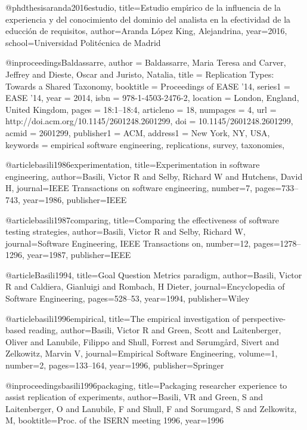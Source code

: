 @phdthesis{aranda2016estudio,
  title={Estudio emp{\'\i}rico de la influencia de la experiencia y del conocimiento del dominio del analista en la efectividad de la educci{\'o}n de requisitos},
  author={Aranda L{\'o}pez King, Alejandrina},
  year={2016},
  school={Universidad Polit{\'e}cnica de Madrid}
}

@inproceedings{Baldassarre,
 author = {Baldassarre, Maria Teresa and Carver, Jeffrey and Dieste, Oscar and Juristo, Natalia},
 title = {Replication Types: Towards a Shared Taxonomy},
 booktitle = {Proceedings of EASE '14},
 series1 = {EASE '14},
 year = {2014},
 isbn = {978-1-4503-2476-2},
 location = {London, England, United Kingdom},
 pages = {18:1--18:4},
 articleno = {18},
 numpages = {4},
 url = {http://doi.acm.org/10.1145/2601248.2601299},
 doi = {10.1145/2601248.2601299},
 acmid = {2601299},
 publisher1 = {ACM},
 address1 = {New York, NY, USA},
 keywords = {empirical software engineering, replications, survey, taxonomies},
}

@article{basili1986experimentation,
  title={Experimentation in software engineering},
  author={Basili, Victor R and Selby, Richard W and Hutchens, David H},
  journal={IEEE Transactions on software engineering},
  number={7},
  pages={733--743},
  year={1986},
  publisher={IEEE}
}

@article{basili1987comparing, 
  title={Comparing the effectiveness of software testing strategies},
  author={Basili, Victor R and Selby, Richard W},
  journal={Software Engineering, IEEE Transactions on},
  number={12},
  pages={1278--1296},
  year={1987},
  publisher={IEEE}
}

@article{Basili1994,
  title={Goal Question Metrics paradigm},
  author={Basili, Victor R and Caldiera, Gianluigi and Rombach, H Dieter},
  journal={Encyclopedia of Software Engineering},
  pages={528--53},
  year={1994},
  publisher={Wiley}
}

@article{basili1996empirical,
  title={The empirical investigation of perspective-based reading},
  author={Basili, Victor R and Green, Scott and Laitenberger, Oliver and Lanubile, Filippo and Shull, Forrest and S{\o}rumg{\aa}rd, Sivert and Zelkowitz, Marvin V},
  journal={Empirical Software Engineering},
  volume={1},
  number={2},
  pages={133--164},
  year={1996},
  publisher={Springer}
}

@inproceedings{basili1996packaging,
  title={Packaging researcher experience to assist replication of experiments},
  author={Basili, VR and Green, S and Laitenberger, O and Lanubile, F and Shull, F and Sorumgard, S and Zelkowitz, M},
  booktitle={Proc. of the ISERN meeting 1996},
  year={1996}
}

